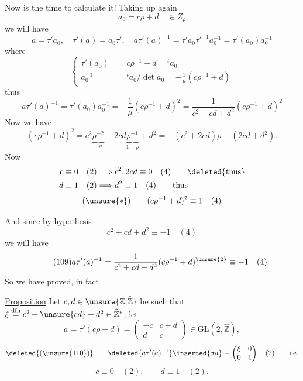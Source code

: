 
Now is the time to calculate it! Taking up again
\[
a_0=c\rho+d\quad\in Z_\rho
\]
we will have
\[
a=\tau'a_0,\quad \tau'(a)=a_0\tau',\quad
a\tau'(a)^{-1}=\tau'a_0\tau'^{-1}a_0^{-1}=\tau'(a_0)a_0^{-1}
\]
where
\[
\left\{\begin{aligned}
\tau'(a_0)&=c\rho^{-1}+d={}^{t}a_0\\
a_0^{-1}&={}^{t}a_0/\det a_0=-\frac1\mu(c\rho^{-1}+d)
\end{aligned}\right.
\]
thus
\[
a\tau'(a)^{-1}=\tau'(a_0)a_0^{-1}
=-\frac1\mu(c\rho^{-1}+d)^2
=\frac1{c^2+cd+d^2}(c\rho^{-1}+d)^2
\]
Now we have
\[
(c\rho^{-1}+d)^2
=c^2\underbrace{\rho^{-2}}_{-\rho}
+2cd\underbrace{\rho^{-1}}_{1-\rho}+d^2
=-(c^2+2cd)\rho+(2cd+d^2).
\]
Now 
\[
\begin{aligned}
c\equiv0\quad(2)&\Longrightarrow c^2,2cd\equiv0\quad(4)
\qquad\text{\deleted{thus}}\\
d\equiv1\quad(2)&\Longrightarrow d^2\equiv1\quad(4)
\qquad\text{thus}
\end{aligned}
\]
\[
(\unsure{*})\qquad (c\rho^{-1}+d)^2\equiv1\quad(4)
\]


And since by hypothesis
\[
c^2+cd+d^2\equiv-1\quad(4)
\]
we will have
\[
\tag{109}
a\tau'(a)^{-1}=\frac1{c^2+cd+d^2}(c\rho^{-1}+d)^{\unsure{2}}
\equiv-1\quad(4)
\]
So we have proved, in fact

\uline{Proposition} Let $c,d\in\unsure{\mathbb Z|\widehat{\mathbb Z}}$
be such that $\xi\overset{\mathrm{dfn}}{=}c^2+\unsure{cd}+d^2
\in\widehat{\mathbb Z}^{*}$, let
\[
a=\tau'(c\rho+d)=\begin{pmatrix}-c&c+d\\d&c\end{pmatrix}
\in\mathrm{GL}(2,\widehat{\mathbb Z}),
\]
\[
\deleted{(\unsure{110})}\qquad
\deleted{a\tau'(a)^{-1}}\inserted{\sigma a}
\equiv\begin{pmatrix}\xi&0\\0&1\end{pmatrix}
\quad(2)\qquad\text{i.e.}
\]
\[
c\equiv0\quad(2),\qquad d\equiv1\quad(2).
\]

